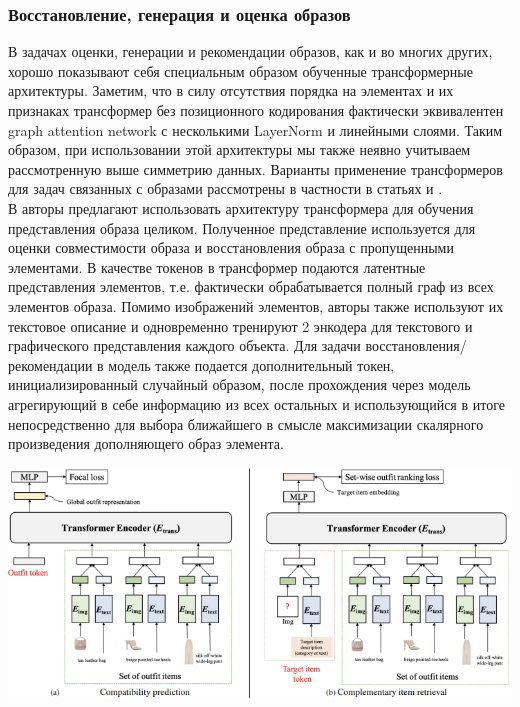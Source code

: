 \documentclass[a4paper,14pt]{extarticle}
\begin{document}
			\subsubsection{Восстановление, генерация и оценка образов}
				В задачах оценки, генерации и рекомендации образов, как и во многих других, хорошо показывают себя специальным образом обученные трансформерные \cite{https://doi.org/10.48550/arXiv.1706.03762} архитектуры. Заметим, что в силу отсутствия порядка на элементах и их признаках трансформер без позиционного кодирования \cite{https://doi.org/10.48550/arXiv.1706.03762} фактически эквивалентен graph attention network \cite{
				https://doi.org/10.48550/arXiv.1710.10903} с несколькими LayerNorm \cite{
				https://doi.org/10.48550/arXiv.1607.06450} и линейными слоями. Таким образом, при использовании этой архитектуры мы также неявно учитываем рассмотренную выше симметрию данных. 
				Варианты применение трансформеров для задач связанных с образами рассмотрены в частности в статьях \cite{https://doi.org/10.48550/arXiv.2303.02483} и \cite{https://doi.org/10.48550/arXiv.2204.04812}.\\
				
				В \cite{https://doi.org/10.48550/arXiv.2204.04812} авторы предлагают использовать архитектуру трансформера для обучения представления образа целиком. Полученное представление используется для оценки совместимости образа и восстановления образа с пропущенными элементами. В качестве токенов в трансформер подаются латентные представления элементов, т.е. фактически обрабатывается полный граф из всех элементов образа. Помимо изображений элементов, авторы также используют их текстовое описание и одновременно тренируют 2 энкодера для текстового и графического представления каждого объекта. Для задачи восстановления/рекомендации в модель также подается дополнительный токен, инициализированный случайный образом, после прохождения через модель агрегирующий в себе информацию из всех остальных и использующийся в итоге непосредственно для выбора ближайшего в смысле максимизации скалярного произведения дополняющего образ элемента.
				
				\includegraphics[scale = 0.8]{pictures/OutfitTransfromer intro.png}
	
\end{document}
